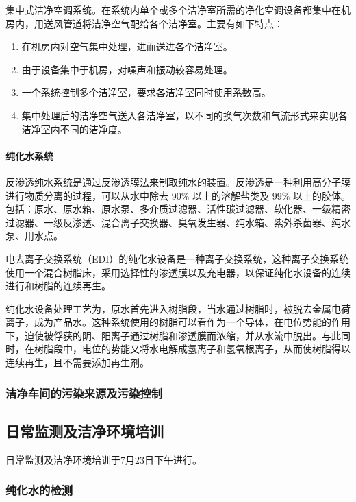 集中式洁净空调系统。在系统内单个或多个洁净室所需的净化空调设备都集中在机房内，用送风管道将洁净空气配给各个洁净室。主要有如下特点：

\begin{enumerate}
    \item 在机房内对空气集中处理，进而送进各个洁净室。
    \item 由于设备集中于机房，对噪声和振动较容易处理。
    \item 一个系统控制多个洁净室，要求各洁净室同时使用系数高。
    \item 集中处理后的洁净空气送入各洁净室，以不同的换气次数和气流形式来实现各洁净室内不同的洁净度。
\end{enumerate}

\paragraph{纯化水系统} 反渗透纯水系统是通过反渗透膜法来制取纯水的装置。反渗透是一种利用高分子膜进行物质分离的过程，可以从水中除去 90\% 以上的溶解盐类及 99\% 以上的胶体。
包括：原水、原水箱、原水泵、多介质过滤器、活性碳过滤器、软化器、一级精密过滤器、一级反渗透、混合离子交换器、臭氧发生器、纯水箱、紫外杀菌器、纯水泵、用水点。

电去离子交换系统（EDI）的纯化水设备是一种离子交换系统，这种离子交换系统使用一个混合树脂床，采用选择性的渗透膜以及充电器，以保证纯化水设备的连续进行和树脂的连续再生。

纯化水设备处理工艺为，原水首先进入树脂段，当水通过树脂时，被脱去金属电荷离子，成为产品水。这种系统使用的树脂可以看作为一个导体，在电位势能的作用下，迫使被俘获的阴、阳离子通过树脂和渗透膜而浓缩，并从水流中脱出。与此同时，在树脂段中，电位的势能又将水电解成氢离子和氢氧根离子，从而使树脂得以连续再生，且不需要添加再生剂。


\subsubsection{洁净车间的污染来源及污染控制}



\subsection{日常监测及洁净环境培训}
日常监测及洁净环境培训于7月23日下午进行。

\subsubsection{纯化水的检测}
